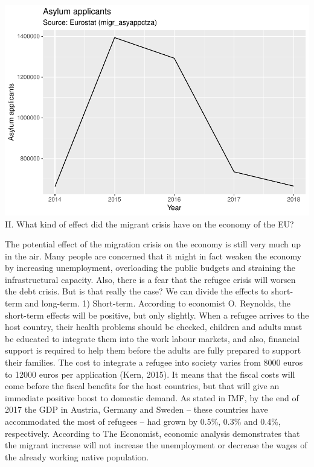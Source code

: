 \documentclass[]{article}
\begin{document}
\includegraphics{Alina_files/figure-latex/unnamed-chunk-4-1.pdf} II.
What kind of effect did the migrant crisis have on the economy of the
EU?

The potential effect of the migration crisis on the economy is still
very much up in the air. Many people are concerned that it might in fact
weaken the economy by increasing unemployment, overloading the public
budgets and straining the infrastructural capacity. Also, there is a
fear that the refugee crisis will worsen the debt crisis. But is that
really the case? We can divide the effects to short-term and long-term.
1) Short-term. According to economist O. Reynolds, the short-term
effects will be positive, but only slightly. When a refugee arrives to
the host country, their health problems should be checked, children and
adults must be educated to integrate them into the work labour markets,
and also, financial support is required to help them before the adults
are fully prepared to support their families. The cost to integrate a
refugee into society varies from 8000 euros to 12000 euros per
application (Kern, 2015). It means that the fiscal costs will come
before the fiscal benefits for the host countries, but that will give an
immediate positive boost to domestic demand. As stated in IMF, by the
end of 2017 the GDP in Austria, Germany and Sweden -- these countries
have accommodated the most of refugees -- had grown by 0.5\%, 0.3\% and
0.4\%, respectively. According to The Economist, economic analysis
demonstrates that the migrant increase will not increase the
unemployment or decrease the wages of the already working native
population.
\end{document}
